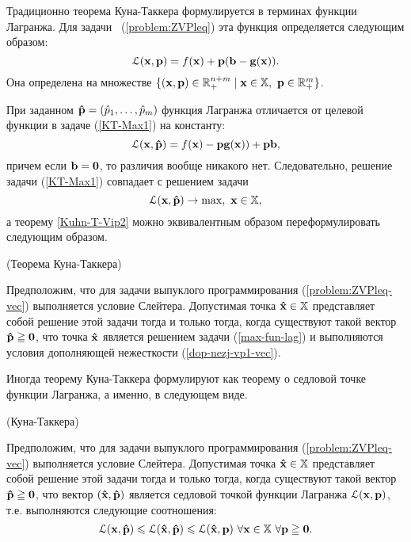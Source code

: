     Традиционно теорема Куна-Таккера формулируется в терминах
    функции Лагранжа. Для задачи ~(\ref{problem:ZVPleq}) эта функция
    определяется следующим образом:
\[
    \mathcal{L}(\mathbf{x},\mathbf{p})
        =f(\mathbf{x})+\mathbf{p}(\mathbf{b}-\mathbf{g}(\mathbf{x})).
\]
    Она определена на множестве
    $\{(\mathbf{x},\mathbf{p})\in\mathbb{R}^{n+m}_{+} \mid \mathbf{x}\in\mathbb{X}, \
    \mathbf{p}\in\mathbb{R}^{m}_{+}\}$.


    При заданном
    $\mathbf{\hat{p}}=(\hat{p}_{1},\ldots,\hat{p}_{m})$
    функция Лагранжа отличается от целевой функции в задаче
    (\ref{KT-Max1}) на константу:
\[
    \mathcal{L}(\mathbf{x},\mathbf{\hat{p}})=f(\mathbf{x})-\mathbf{p}\mathbf{g}(\mathbf{x}))+\mathbf{p}\mathbf{b},
\]
    причем если $\mathbf{b}=\mathbf{0}$, то различия вообще никакого
    нет. Следовательно, решение задачи (\ref{KT-Max1}) совпадает с
    решением задачи
\begin{equation}\label{max-fun-lag}
    \mathcal{L}(\mathbf{x},\mathbf{\hat{p}})\rightarrow\max, \
    \mathbf{x}\in\mathbb{X},
\end{equation}
    а теорему \ref{Kuhn-T-Vip2} можно эквивалентным образом
    переформулировать следующим образом.

\begin{teop}\label{Kuhn-T-Vip3}(Теорема Куна-Таккера)

    Предположим, что для задачи выпуклого программирования
    (\ref{problem:ZVPleq-vec}) выполняется условие Слейтера.
    Допустимая точка $\mathbf{\hat x}\in \mathbb{X}$ представляет собой решение
     этой задачи тогда и только тогда, когда существуют
    такой вектор $\mathbf{\hat{p}}\geqq\mathbf{0}$,
    что точка $\mathbf{\hat x}$ является решением задачи
    (\ref{max-fun-lag}) и выполняются условия дополняющей нежесткости
    (\ref{dop-nezj-vp1-vec}).
\end{teop}







    Иногда теорему Куна-Таккера формулируют как теорему о седловой
    точке функции Лагранжа, а именно, в следующем виде.
\begin{teop}\label{Kuhn-T-Vip4}(Куна-Таккера)

    Предположим, что для задачи выпуклого программирования
    (\ref{problem:ZVPleq-vec}) выполняется условие Слейтера.
    Допустимая точка $\mathbf{\hat x}\in \mathbb{X}$ представляет собой
    решение этой
    задачи тогда и только тогда, когда существуют
    такой вектор $\mathbf{\hat{p}}\geqq\mathbf{0}$, что вектор
    $(\mathbf{\hat x},\mathbf{\hat p})$ является седловой
    точкой функции Лагранжа $\mathcal{L}(\mathbf{x},\mathbf{p})$, т.е.
    выполняются следующие соотношения:
\[
    \mathcal{L}(\mathbf{x},\mathbf{\hat{p}})
    \leqslant\mathcal{L}(\mathbf{\hat{x}},\mathbf{\hat{p}})
    \leqslant\mathcal{L}(\mathbf{\hat{x}},\mathbf{p}) \
    \forall  \mathbf{x}\in\mathbb{X} \ \forall \mathbf{p}\geqq\mathbf{0}.
\]
\end{teop}

